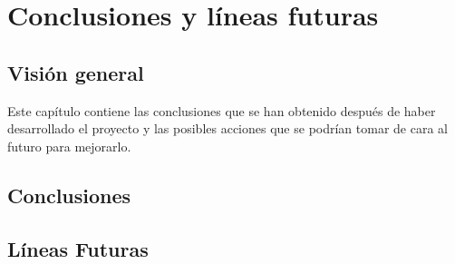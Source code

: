 \chapter{Conclusiones y líneas futuras}

\section{Visión general}

Este capítulo contiene las conclusiones que se han obtenido después de haber desarrollado el proyecto y las posibles acciones que se podrían tomar de cara al futuro para mejorarlo.

\section{Conclusiones}

\section{Líneas Futuras}